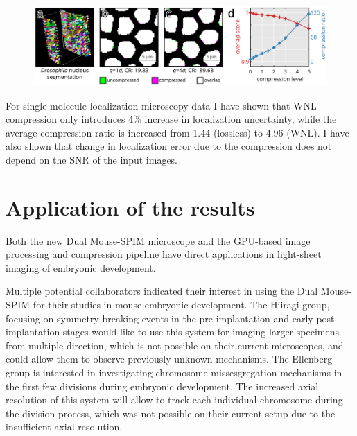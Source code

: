 \documentclass{booklet_style}
\begin{document}
    \begin{figure}
      \centering
      \includegraphics[page=1,width=\textwidth]{4_gpu/LLvsB3D}
      \label{fig:wnlDroso}
    \end{figure}
    
    For single molecule localization microscopy data I have shown that WNL compression only introduces 4\% increase in localization uncertainty, while the average compression ratio is increased from 1.44 (lossless) to 4.96 (WNL). I have also shown that change in localization error due to the compression does not depend on the SNR of the input images.

    
    


\section{Application of the results}
  Both the new Dual Mouse-SPIM microscope and the GPU-based image processing and compression pipeline have direct applications in light-sheet imaging of embryonic development.

  Multiple potential collaborators indicated their interest in using the Dual Mouse-SPIM for their studies in mouse embryonic development. The Hiiragi group, focusing on symmetry breaking events in the pre-implantation and early post-implantation stages would like to use this system for imaging larger specimens from multiple direction, which is not possible on their current microscopes, and could allow them to observe previously unknown mechanisms. The Ellenberg group is interested in investigating chromosome missesgregation mechanisms in the first few divisions during embryonic development. The increased axial resolution of this system will allow to track each individual chromosome during the division process, which was not possible on their current setup due to the insufficient axial resolution.
\end{document}
